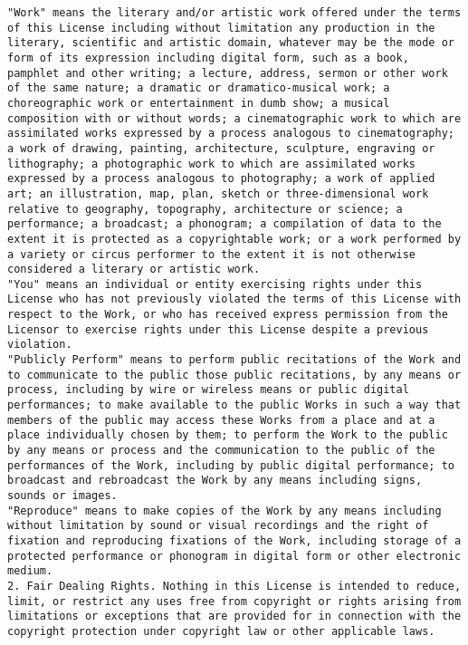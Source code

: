 \documentclass[10pt,A4]{book}
\begin{document}
\begin{verbatim}
"Work" means the literary and/or artistic work offered under the terms of this License including without limitation any production in the literary, scientific and artistic domain, whatever may be the mode or form of its expression including digital form, such as a book, pamphlet and other writing; a lecture, address, sermon or other work of the same nature; a dramatic or dramatico-musical work; a choreographic work or entertainment in dumb show; a musical composition with or without words; a cinematographic work to which are assimilated works expressed by a process analogous to cinematography; a work of drawing, painting, architecture, sculpture, engraving or lithography; a photographic work to which are assimilated works expressed by a process analogous to photography; a work of applied art; an illustration, map, plan, sketch or three-dimensional work relative to geography, topography, architecture or science; a performance; a broadcast; a phonogram; a compilation of data to the extent it is protected as a copyrightable work; or a work performed by a variety or circus performer to the extent it is not otherwise considered a literary or artistic work.
"You" means an individual or entity exercising rights under this License who has not previously violated the terms of this License with respect to the Work, or who has received express permission from the Licensor to exercise rights under this License despite a previous violation.
"Publicly Perform" means to perform public recitations of the Work and to communicate to the public those public recitations, by any means or process, including by wire or wireless means or public digital performances; to make available to the public Works in such a way that members of the public may access these Works from a place and at a place individually chosen by them; to perform the Work to the public by any means or process and the communication to the public of the performances of the Work, including by public digital performance; to broadcast and rebroadcast the Work by any means including signs, sounds or images.
"Reproduce" means to make copies of the Work by any means including without limitation by sound or visual recordings and the right of fixation and reproducing fixations of the Work, including storage of a protected performance or phonogram in digital form or other electronic medium.
2. Fair Dealing Rights. Nothing in this License is intended to reduce, limit, or restrict any uses free from copyright or rights arising from limitations or exceptions that are provided for in connection with the copyright protection under copyright law or other applicable laws.


\end{verbatim}
\end{document}
